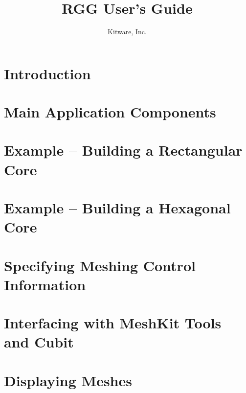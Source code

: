 \documentclass[letterpaper,10pt,draft]{book}
\title{RGG User's Guide}
\author{Kitware, Inc.}
\begin{document}
\maketitle
\tableofcontents

\chapter{Introduction}
\label{chapter:Introduction}


\chapter{Main Application Components}
\label{chapter:Main Application Components}


\chapter{Example -- Building a Rectangular Core}
\label{chapter:Example -- Building a Rectangular Core}


\chapter{Example -- Building a Hexagonal Core}
\label{chapter:Example -- Building a Hexagonal Core}


\chapter{Specifying Meshing Control Information}
\label{chapter:Specifying Meshing Control Information}


\chapter{Interfacing with MeshKit Tools and Cubit}
\label{chapter:Interfacing with MeshKit Tools and Cubit}


\chapter{Displaying Meshes}
\label{chapter:Displaying Meshes}

\end{document}
